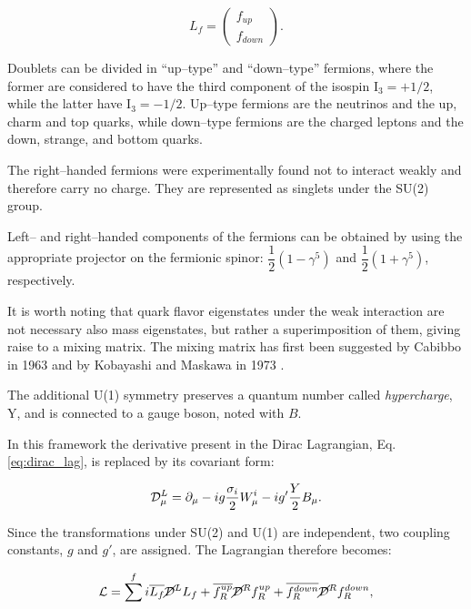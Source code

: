 \begin{equation}
L_f = \left(\begin{array}{c}f_{up} \\f_{down}\end{array}\right).
\end{equation}

Doublets can be divided in ``up--type'' and ``down--type'' fermions, where the former are considered to have the third component of the isospin I$_3 = +1/2$, while the latter have I$_3 = -1/2$. Up--type fermions are the neutrinos and the up, charm and top quarks, while down--type fermions are the charged leptons and the down, strange, and bottom quarks.

The right--handed fermions were experimentally found not to interact weakly and therefore carry no charge. They are represented as singlets under the SU(2) group.

Left-- and right--handed components of the fermions can be obtained by using the appropriate projector on the fermionic spinor: $\dfrac{1}{2}(1-\gamma^5)$ and $\dfrac{1}{2}(1+\gamma^5)$, respectively.

It is worth noting that quark flavor eigenstates under the weak interaction are not necessary also mass eigenstates, but rather a superimposition of them, giving raise to a mixing matrix. The mixing matrix has first been suggested by Cabibbo in 1963 \cite{Cabibbo:1963yz} and by Kobayashi and Maskawa in 1973 \cite{Kobayashi:1973fv}.

The additional U(1) symmetry preserves a quantum number called \emph{hypercharge}, Y, and is connected to a gauge boson, noted with $B$. 

In this framework the derivative present in the Dirac Lagrangian, Eq. \ref{eq:dirac_lag}, is replaced by its covariant form:

\begin{equation}
\mathcal{D}^L_\mu = \partial_\mu - ig\dfrac{\sigma_i}{2}W^i_\mu - ig'\dfrac{Y}{2}B_\mu.
\end{equation}

Since the transformations under SU(2) and U(1) are independent, two coupling constants, $g$ and $g'$, are assigned. The Lagrangian therefore becomes:

\begin{equation}
\mathcal{L} = \sum^f i \overline{L_f}\cancel{\mathcal{D}}^LL_f + \overline{f^{up}_R}\cancel{\mathcal{D}}^Rf^{up}_R  + \overline{f^{down}_R}\cancel{\mathcal{D}}^Rf^{down}_R,
\end{equation}

